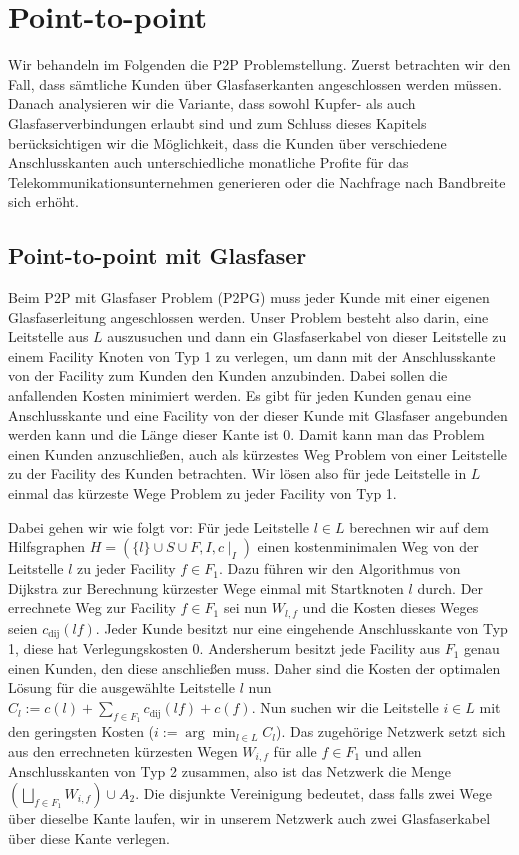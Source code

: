 \documentclass[11pt,a4paper]{article}
\theoremstyle{my_th_style1}
\begin{document}
\section{Point-to-point}

Wir behandeln im Folgenden die P2P Problemstellung.
Zuerst betrachten wir den Fall, dass s\"amtliche Kunden \"uber Glasfaserkanten angeschlossen werden m\"ussen.
Danach analysieren wir die Variante, dass sowohl Kupfer- als auch Glasfaserverbindungen erlaubt sind und zum Schluss dieses Kapitels ber\"ucksichtigen wir die M\"oglichkeit, dass die Kunden \"uber verschiedene Anschlusskanten auch unterschiedliche monatliche Profite f\"ur das Telekommunikationsunternehmen generieren oder die Nachfrage nach Bandbreite sich erh\"oht.

\subsection{Point-to-point mit Glasfaser}

Beim P2P mit Glasfaser Problem (P2PG) muss jeder Kunde mit einer eigenen Glasfaserleitung angeschlossen werden.
Unser Problem besteht also darin, eine Leitstelle aus $L$ auszusuchen und dann ein Glasfaserkabel von dieser Leitstelle zu einem Facility Knoten von Typ 1 zu verlegen, um dann mit der Anschlusskante von der Facility zum Kunden den Kunden anzubinden.
Dabei sollen die anfallenden Kosten minimiert werden.
Es gibt f\"ur jeden Kunden genau eine Anschlusskante und eine Facility von der dieser Kunde mit Glasfaser angebunden werden kann und die Länge dieser Kante ist 0.
Damit kann man das Problem einen Kunden anzuschließen, auch als kürzestes Weg Problem von einer Leitstelle zu der Facility des Kunden betrachten.
Wir lösen also für jede Leitstelle in $L$ einmal das kürzeste Wege Problem zu jeder Facility von Typ 1.

Dabei gehen wir wie folgt vor:
Für jede Leitstelle $ l \in L$ berechnen wir auf dem Hilfsgraphen $H=(\{l\} \cup S \cup F , I,c\mid_I)$ einen kostenminimalen Weg von der Leitstelle $l$ zu jeder Facility $f \in F_1$. Dazu führen wir den Algorithmus von Dijkstra zur Berechnung k\"urzester Wege einmal mit Startknoten $l$ durch.
Der errechnete Weg zur Facility \( f \in F_1\) sei nun $W_{l,f}$ und die Kosten dieses Weges seien $c_{\text{dij}}(lf)$. 
Jeder Kunde besitzt nur eine eingehende Anschlusskante von Typ 1, diese hat Verlegungskosten 0.
Andersherum besitzt jede Facility aus $F_1$ genau einen Kunden, den diese anschließen muss. 
Daher sind die Kosten der optimalen Lösung für die ausgewählte Leitstelle $l$ nun $C_l:=c(l) + \displaystyle\sum_{f \in F_1} c_{\text{dij}}(lf) + c(f)$. 
Nun suchen wir die Leitstelle $i \in L$ mit den geringsten Kosten ($i:=\arg \displaystyle\min_{l \in L} C_l$).
Das zugehörige Netzwerk setzt sich aus den errechneten kürzesten Wegen $W_{i,f}$ für alle $f \in F_1$ und allen Anschlusskanten von Typ 2 zusammen, also ist das Netzwerk die Menge $(\bigsqcup_{f \in F_1 }W_{i,f}) \cup A_2 $.
Die disjunkte Vereinigung bedeutet, dass falls zwei Wege über dieselbe Kante laufen, wir in unserem Netzwerk auch zwei Glasfaserkabel über diese Kante verlegen.
\end{document}
